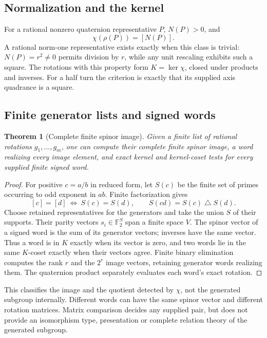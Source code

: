 \documentclass[11pt]{article}
\newcommand{\F}{\mathbb F}
\newtheorem{theorem}{Theorem}[section]
\theoremstyle{remark}
\begin{document}
\subsection{Normalization and the kernel}

For a rational nonzero quaternion representative \(P\), \(N(P)>0\), and
\[
 \chi(\rho(P))=[N(P)].
\]
A rational norm-one representative exists exactly when this class is
trivial: \(N(P)=r^2\ne0\) permits division by \(r\), while any unit
rescaling exhibits such a square. The rotations with this property form
\(K=\ker\chi\), closed under products and inverses. For a half turn the
criterion is exactly that its supplied axis quadrance is a square.

\subsection{Finite generator lists and signed words}

\begin{theorem}[Complete finite spinor image]
Given a finite list of rational rotations \(g_1,\ldots,g_m\), one can
compute their complete finite spinor image, a word realizing every image
element, and exact kernel and kernel-coset tests for every supplied finite
signed word.
\end{theorem}
\begin{proof}
For positive \(c=a/b\) in reduced form, let \(S(c)\) be the finite set of
primes occurring to odd exponent in \(ab\). Finite factorization gives
\[
 [c]=[d]\ \Longleftrightarrow\ S(c)=S(d),
 \qquad S(cd)=S(c)\mathbin\triangle S(d).
\]
Choose retained representatives for the generators and take the union \(S\)
of their supports. Their parity vectors \(s_i\in\F_2^S\) span a finite
space \(V\). The spinor vector of a signed word is the sum of its generator
vectors; inverses have the same vector. Thus a word is in \(K\) exactly
when its vector is zero, and two words lie in the same \(K\)-coset exactly
when their vectors agree. Finite binary elimination computes the rank \(r\)
and the \(2^r\) image vectors, retaining generator words realizing them.
The quaternion product separately evaluates each word's exact rotation.
\end{proof}

This classifies the image and the quotient detected by \(\chi\), not the
generated subgroup internally. Different words can have the same spinor
vector and different rotation matrices. Matrix comparison decides any
supplied pair, but does not provide an isomorphism type, presentation or
complete relation theory of the generated subgroup.
\end{document}
